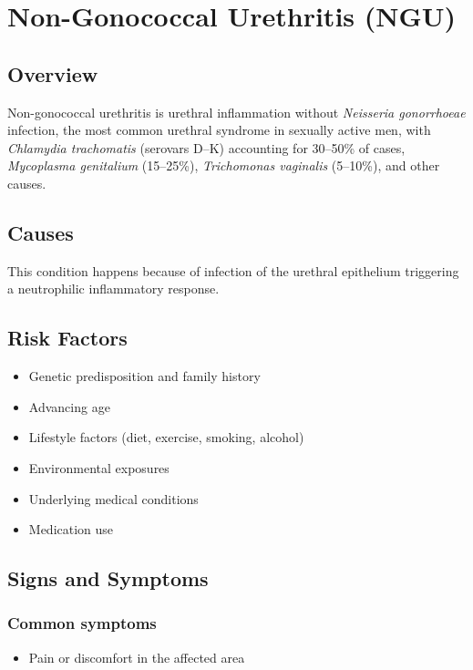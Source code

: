 \chapter{Non-Gonococcal Urethritis (NGU)}
\label{sec:Non-Gonococcal Urethritis}

\section{Overview}
Non-gonococcal urethritis is urethral inflammation without \textit{Neisseria gonorrhoeae} infection, the most common urethral syndrome in sexually active men, with \textit{Chlamydia trachomatis} (serovars D--K) accounting for 30--50\% of cases, \textit{Mycoplasma genitalium} (15--25\%), \textit{Trichomonas vaginalis} (5--10\%), and other causes.
\section{Causes}
This condition happens because of infection of the urethral epithelium triggering a neutrophilic inflammatory response.     
\section{Risk Factors}

\begin{itemize}[noitemsep]
  \item Genetic predisposition and family history
  \item Advancing age
  \item Lifestyle factors (diet, exercise, smoking, alcohol)
  \item Environmental exposures
  \item Underlying medical conditions
  \item Medication use
\end{itemize}
\section{Signs and Symptoms}

\subsection{Common symptoms}
\begin{itemize}[noitemsep]
  \item Pain or discomfort in the affected area
  \end{itemize}

